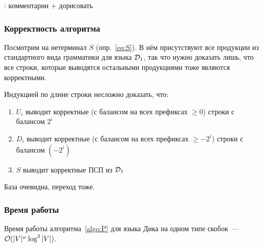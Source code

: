 \TODO: комментарии + дорисовать 

\subsubsection{Корректность алгоритма}

Посмотрим на нетерминал $S$ (опр.~\ref{eq:S}). В нём присутствуют все продукции из стандартного вида грамматики для языка $\mathcal{D}_1$, так что нужно доказать лишь, что все строки, которые выводятся остальными продукциями тоже являются корректными. 

Индукцией по длине строки несложно доказать, что:

\vspace{-\topsep}
\begin{enumerate}
  \setlength\itemsep{-0.1em}
  \item $U_i$ выводит корректные (с балансом на всех префиксах $\ge 0$) строки с балансом $2^{i}$
  \item $D_i$ выводит корректные (с балансом на всех префиксах $\ge -2^{i}$) строки с балансом $(-2^{i})$
  \item $S$ выводит корректные ПСП из $\mathcal{D}_1$
\end{enumerate}

База очевидна, переход тоже.

\subsubsection{Время работы}

\begin{theorem}\label{thm:dyck_1}
  Время работы алгоритма~\ref{algo:P} для языка Дика на одном типе скобок~--- $\mathcal{O}(|V|^{\omega} \log^3 |V|)$.
\end{theorem}

